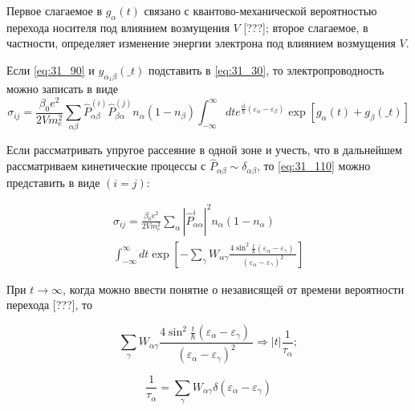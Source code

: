 \noindent Первое слагаемое в $g_{\alpha }\left(t\right)$ связано с квантово-механической вероятностью перехода носителя под влиянием возмущения $V$ [???]; второе слагаемое, в частности, определяет изменение энергии электрона под влиянием возмущения $V$.

\noindent Если \eqref{eq:31_90} и $y_{{\alpha }_1\beta }\left(\_t\right)$ подставить в \eqref{eq:31_30}, то электропроводность можно записать в виде
\begin{equation} \label{eq:31_110}
{\sigma }_{ij}=\frac{{\beta }_0e^2}{2Vm^2_e}\sum_{\alpha \beta }{{\hat{P}}^{\left(i\right)}_{\alpha \beta }{\hat{P}}^{\left(j\right)}_{\beta \alpha }n_{\alpha }\left(1-n_{\beta }\right)}\int^{\infty }_{-\infty }{d te^{\frac{it}{\hbar }\left({\varepsilon }_{\alpha }-{\varepsilon }_{\beta }\right)}\exp \left[g_{\alpha }\left(t\right)+g_{\beta }\left(\_t\right)\right]}
\end{equation} 

\noindent Если рассматривать упругое рассеяние в одной зоне и учесть, что в дальнейшем рассматриваем кинетические процессы с ${\hat{P}}_{\alpha \beta }\sim {\delta }_{\alpha \beta }$, то \eqref{eq:31_110} можно представить в виде $(i=j)$:

\begin{multline} \label{eq:31_120}
{\sigma }_{ij}=\frac{{\beta }_0e^2}{2Vm^2_e}\sum_{\alpha }{{\left|{\hat{P}}^i_{\alpha \alpha }\right|}^2 n_{\alpha }\left(1-n_{\alpha }\right)}\\
\int^{\infty }_{-\infty }{d t{\exp \left[-\sum_{\gamma }{W_{\alpha \gamma }\frac{4{{\sin}^2 \frac{t}{\hbar }\left({\varepsilon }_{\alpha }-{\varepsilon }_{\gamma }\right)\ }}{{\left({\varepsilon }_{\alpha }-{\varepsilon }_{\gamma }\right)}^2}}\right]}}
\end{multline}

\noindent При $t\to \infty $, {\color{red}когда можно ввести понятие о независящей от времени вероятности перехода [???]}, то

\begin{equation} \label{eq:31_130}
\sum_{\gamma }{W_{\alpha \gamma }\frac{4{{\sin}^2 \frac{t}{\hbar }\left({\varepsilon }_{\alpha }-{\varepsilon }_{\gamma }\right)\ }}{{\left({\varepsilon }_{\alpha }-{\varepsilon }_{\gamma }\right)}^2}}\Rightarrow \left|t\right|\frac{1}{{\tau }_{\alpha }};
\end{equation}
 
\begin{equation} \label{eq:31_140}
\frac{1}{{\tau }_{\alpha }}=\sum_{\gamma }{W_{\alpha \gamma }\delta \left({\varepsilon }_{\alpha }-{\varepsilon }_{\gamma }\right)}
\end{equation}


